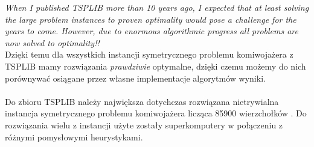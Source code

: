 \documentclass[a4paper]{article}
\theoremstyle{defn}
\theoremstyle{theorem}
\theoremstyle{lemma}
\theoremstyle{cor}
\theoremstyle{fact}
\begin{document}
\textit{When I published TSPLIB more than 10 years ago, I expected that at least solving the large problem instances to proven optimality would pose a challenge for the years to come.
However, due to enormous algorithmic progress all problems are now solved to optimality!!}
\\
Dzięki temu dla wszystkich instancji symetrycznego problemu komiwojażera z TSPLIB mamy rozwiązania \textit{prawdziwie} optymalne, dzięki czemu możemy do nich porównywać osiągane przez własne implementacje algorytmów wyniki.\\\\
Do zbioru TSPLIB należy największa dotychczas rozwiązana nietrywialna instancja symetrycznego problemu komiwojażera licząca 85900 wierzchołków \cite{85900}. Do rozwiązania wielu z instancji użyte zostały superkomputery w połączeniu z różnymi pomysłowymi heurystykami.
\end{document}

